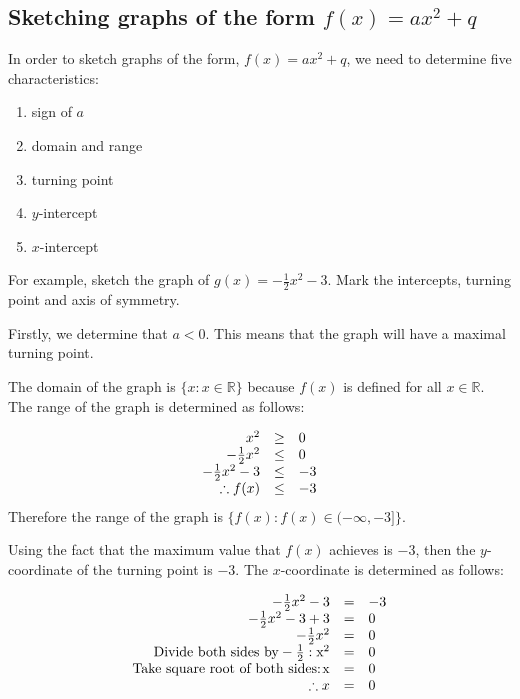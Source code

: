 \subsection*{Sketching graphs of the form $f(x)=a{x}^{2}+q$}
\nopagebreak
In order to sketch graphs of the form, $f(x)=a{x}^{2}+q$, we need to determine five characteristics:\par 
\begin{enumerate}[noitemsep, label=\textbf{\arabic*}. ] 
\item sign of $a$
\item domain and range
\item turning point
\item $y$-intercept
\item $x$-intercept
\end{enumerate}
For example, sketch the graph of $g(x)=-\frac{1}{2}{x}^{2}-3$. Mark the intercepts, turning point and axis of symmetry.\par 
Firstly, we determine that $a<0$. This means that the graph will have a maximal turning point.\par 
The domain of the graph is $\{x:x\in \mathbb{R}\}$ because $f(x)$ is defined for all $x\in \mathbb{R}$. The range of the graph is determined as follows:\par 
\nopagebreak\noindent{}
\begin{equation*}
\begin{array}{ccc}\hfill {x}^{2}& \ge & 0\hfill \\
 \hfill -\frac{1}{2}{x}^{2}& \le & 0\hfill \\
 \hfill -\frac{1}{2}{x}^{2}-3& \le & -3\hfill \\
 \hfill \therefore f(x)& \le & -3\hfill \end{array}
\end{equation*}
Therefore the range of the graph is $\{f(x):f(x)\in (-\infty ,-3]\}$.\par 
Using the fact that the maximum value that $f(x)$ achieves is $-3$, then the $y$-coordinate of the turning point is $-3$. The $x$-coordinate is determined as follows:\par 
\nopagebreak\noindent{}
\begin{equation*}
\begin{array}{ccc}\hfill -\frac{1}{2}{x}^{2}-3& =& -3\hfill \\ \hfill -\frac{1}{2}{x}^{2}-3+3& =& 0\hfill \\ \hfill -\frac{1}{2}{x}^{2}& =& 0\hfill \\ \hfill \mbox{Divide both sides by}-\frac{1}{2}:{\mbox{x}}^{2}& =& 0\hfill \\ \hfill \mbox{Take square root of both sides:}\phantom{\rule{1.pt}{0ex}}\mathrm{x}& =& 0\hfill \\ \hfill \therefore x& =& 0\hfill \end{array}
\end{equation*}
